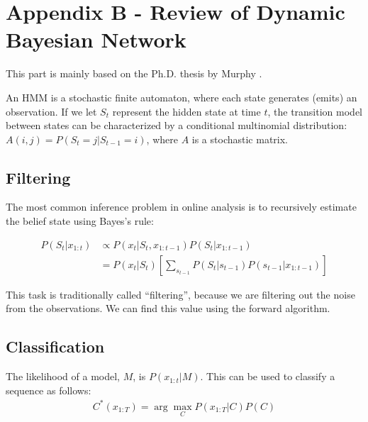\section{Appendix B - Review of Dynamic Bayesian Network}
This part is mainly based on the Ph.D. thesis by Murphy \cite{murphy02}.

An HMM is a stochastic finite automaton, where each state generates (emits) an
observation. If we let $S_t$ represent the hidden state at time $t$, the
transition model between states can be characterized by a conditional
multinomial distribution: $A(i, j) = P(S_t = j | S_{t-1} = i)$, where $A$ is a
stochastic matrix.

\subsection{Filtering}
The most common inference problem in online analysis is to recursively estimate
the belief state using Bayes's rule:

\begin{align*}
P(S_t | x_{1:t}) & \propto P(x_t | S_t, x_{1:t-1})P(S_t | x_{1:t-1}) \\
 				 & = P(x_t | S_t) \left[\sum_{s_{t - 1}} 
				 	 P(S_t | s_{t - 1})P(s_{t - 1} | x_{1:t - 1})\right]	
\end{align*}

This task is traditionally called ``filtering'', because we are filtering out
the noise from the observations. We can find this value using the forward
algorithm.

\subsection{Classification}
The likelihood of a model, $M$, is $P(x_{1:t}|M)$. This can be used to classify
a sequence as follows:
\begin{align*}
C^*(x_{1:T}) = \arg \max_{C} P(x_{1:T} | C)P(C)
\end{align*}

